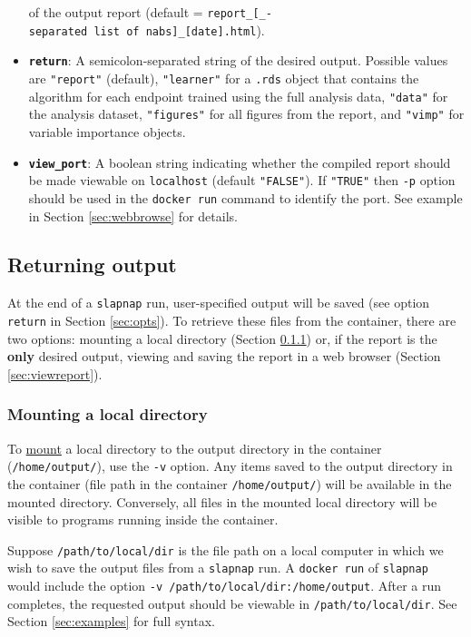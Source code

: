 \documentclass[]{article}
\begin{document}
\begin{itemize}
  of the output report (default =
  \texttt{report\_{[}\_-separated\ list\ of\ nabs{]}\_{[}date{]}.html}).
\item
  \textbf{\texttt{return}}: A semicolon-separated string of the desired
  output. Possible values are \texttt{"report"} (default),
  \texttt{"learner"} for a \texttt{.rds} object that contains the
  algorithm for each endpoint trained using the full analysis data,
  \texttt{"data"} for the analysis dataset, \texttt{"figures"} for all
  figures from the report, and \texttt{"vimp"} for variable importance
  objects.
\item
  \textbf{\texttt{view\_port}}: A boolean string indicating whether the
  compiled report should be made viewable on \texttt{localhost} (default
  \texttt{"FALSE"}). If \texttt{"TRUE"} then \texttt{-p} option should
  be used in the \texttt{docker\ run} command to identify the port. See
  example in Section \ref{sec:webbrowse} for details.
\end{itemize}

\subsection{Returning output}\label{returning-output}

At the end of a \texttt{slapnap} run, user-specified output will be
saved (see option \texttt{return} in Section \ref{sec:opts}). To
retrieve these files from the container, there are two options: mounting
a local directory (Section \ref{sec:mounting}) or, if the report is the
\textbf{only} desired output, viewing and saving the report in a web
browser (Section \ref{sec:viewreport}).

\subsubsection{Mounting a local directory}\label{sec:mounting}

To \href{https://docs.docker.com/storage/bind-mounts/}{mount} a local
directory to the output directory in the container
(\texttt{/home/output/}), use the \texttt{-v} option. Any items saved to
the output directory in the container (file path in the container
\texttt{/home/output/}) will be available in the mounted directory.
Conversely, all files in the mounted local directory will be visible to
programs running inside the container.

Suppose \texttt{/path/to/local/dir} is the file path on a local computer
in which we wish to save the output files from a \texttt{slapnap} run. A
\texttt{docker\ run} of \texttt{slapnap} would include the option
\texttt{-v\ /path/to/local/dir:/home/output}. After a run completes, the
requested output should be viewable in \texttt{/path/to/local/dir}. See
Section \ref{sec:examples} for full syntax.
\end{document}

